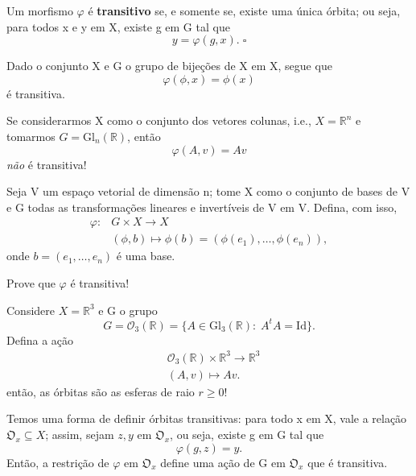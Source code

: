 \documentclass[../algebraIII_notes.tex]{subfiles}
\begin{document}
\begin{def*}
	Um morfismo \(\varphi \) é \textbf{transitivo} se, e somente se, existe uma única órbita; ou seja, para todos x e y em X, existe g em G tal que
	\[
		y = \varphi (g, x). \;\square
	\]
\end{def*}
\begin{example}
	Dado o conjunto X e G o grupo de bijeções de X em X, segue que
	\[
		\varphi (\phi, x) = \phi(x)
	\]
	é transitiva.
\end{example}
\begin{example}
	Se considerarmos X como o conjunto dos vetores colunas, i.e., \(X = \mathbb{R}^{n}\) e tomarmos \(G = \mathrm{Gl}_{n}(\mathbb{R})\), então
	\[
		\varphi (A, v) = Av
	\]
	\textit{não} é transitiva!
\end{example}
\begin{example}
	Seja V um espaço vetorial de dimensão n; tome X como o conjunto de bases de V e G todas as transformações lineares e invertíveis de V em V. Defina, com isso,
	\begin{align*}
		\varphi : & G\times X\rightarrow X                                            \\
		          & (\phi, b)\longmapsto \phi(b) = (\phi(e_1), \dotsc , \phi(e_{n})),
	\end{align*}
	onde \(b=(e_1,\dotsc , e_{n})\) é uma base.
	\begin{exr}
		Prove que \(\varphi \) é transitiva!
	\end{exr}
\end{example}
\begin{example}
	Considere \(X = \mathbb{R}^{3}\) e G o grupo
	\[
		G = \mathcal{O}_{3}(\mathbb{R})=\{A\in \mathrm{Gl}_{3}(\mathbb{R}):\; A^{t}A = \mathrm{Id}\}.
	\]
	Defina a ação\begin{align*}
		 & \mathcal{O}_{3}(\mathbb{R})\times \mathbb{R}^{3}\rightarrow \mathbb{R}^{3} \\
		 & (A, v )\longmapsto Av.
	\end{align*}
	então, as órbitas são as esferas de raio \(r\geq 0\)!
\end{example}
Temos uma forma de definir órbitas transitivas: para todo x em X, vale a relação \(\mathfrak{O}_{x}\subseteq X\); assim, sejam \(z, y\) em \(\mathfrak{O}_{x}\), ou seja, existe g em G tal que
\[
	\varphi (g, z) = y.
\]
Então, a restrição de \(\varphi \) em \(\mathfrak{O}_{x}\) define uma ação de G em \(\mathfrak{O}_{x}\) que é transitiva.
\end{document}
